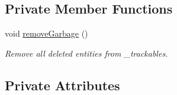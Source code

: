 \subsection*{Private Member Functions}
\begin{DoxyCompactItemize}
\item 
void \hyperlink{classTrackingManager_a66f8f6f788618cb5aecfc1c228be2460}{remove\-Garbage} ()
\begin{DoxyCompactList}\small\item\em Remove all deleted entities from \-\_\-trackables. \end{DoxyCompactList}\end{DoxyCompactItemize}
\subsection*{Private Attributes}
